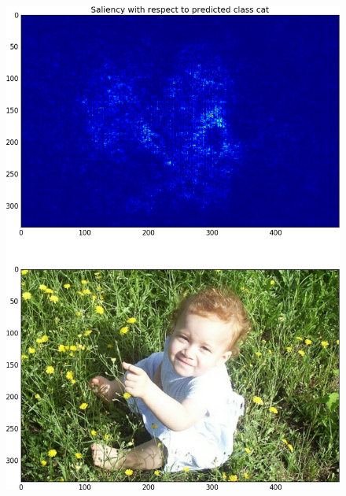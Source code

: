 \documentclass[12pt]{article}
\begin{document}
\begin{enumerate}
\begin{figure}[H]
		\includegraphics[height=0.8\textheight]{../Figures/hw2_4_vii_test_neg_004831.png}
	\end{figure}
\end{enumerate}
\end{document}
